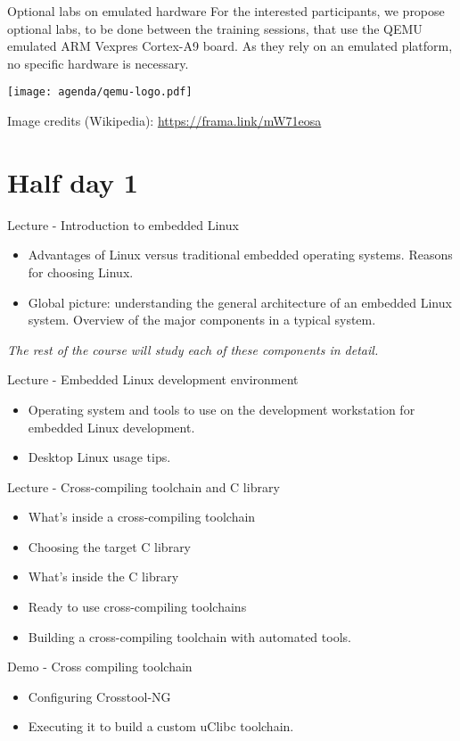 \documentclass[a4paper,12pt,obeyspaces,spaces,hyphens]{article}
\begin{document}
\feagendatwocolumn
{Optional labs on emulated hardware}
{
  For the interested participants, we propose optional labs, to be
  done between the training sessions, that use the QEMU emulated ARM
  Vexpres Cortex-A9 board. As they rely on an emulated platform, no
  specific hardware is necessary.
}
{}
{
  \begin{center}
    \texttt{[image: agenda/qemu-logo.pdf]}
  \end{center}
  \scriptsize Image credits (Wikipedia): \url{https://frama.link/mW71eosa}
}


\section{Half day 1}

\feagendatwocolumn
{Lecture - Introduction to embedded Linux}
{
  \begin{itemize}
  \item Advantages of Linux versus traditional embedded operating systems.
        Reasons for choosing Linux.
  \item Global picture: understanding the general architecture of an
        embedded Linux system. Overview of the major components in a typical
        system.
  \end{itemize}
  {\em The rest of the course will study each of these components in detail.}
}
{Lecture - Embedded Linux development environment}
{
  \begin{itemize}
  \item Operating system and tools to use on the development
        workstation for embedded Linux development.
  \item Desktop Linux usage tips.
  \end{itemize}
}

\feagendatwocolumn
{Lecture - Cross-compiling toolchain and C library}
{
  \begin{itemize}
  \item What's inside a cross-compiling toolchain
  \item Choosing the target C library
  \item What's inside the C library
  \item Ready to use cross-compiling toolchains
  \item Building a cross-compiling toolchain with automated tools.
  \end{itemize}
}
{Demo - Cross compiling toolchain}
{
  \begin{itemize}
  \item Configuring Crosstool-NG
  \item Executing it to build a custom uClibc toolchain.
  \end{itemize}
}
\end{document}
